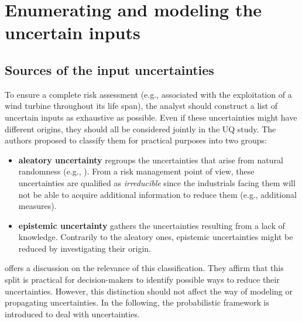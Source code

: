 \section{Enumerating and modeling the uncertain inputs}

\subsection{Sources of the input uncertainties}

To ensure a complete risk assessment (e.g., associated with the exploitation of a wind turbine throughout its life span), the analyst should construct a list of uncertain inputs as exhaustive as possible. 
Even if these uncertainties might have different origins, they should all be considered jointly in the UQ study. 
The authors proposed to classify them for practical purposes into two groups:
\begin{itemize}
    \item \textbf{aleatory uncertainty} regroups the uncertainties that arise from natural randomness (e.g., ). 
    From a risk management point of view, these uncertainties are qualified as \textit{irreducible} since the industrials facing them will not be able to acquire additional information to reduce them (e.g., additional measures).     
    \item \textbf{epistemic uncertainty} gathers the uncertainties resulting from a lack of knowledge. 
    Contrarily to the aleatory ones, epistemic uncertainties might be reduced by investigating their origin. 
\end{itemize} 

\cite{Kiureghian2009} offers a discussion on the relevance of this classification. 
They affirm that this split is practical for decision-makers to identify possible ways to reduce their uncertainties. 
However, this distinction should not affect the way of modeling or propagating uncertainties. 
In the following, the probabilistic framework is introduced to deal with uncertainties. 


